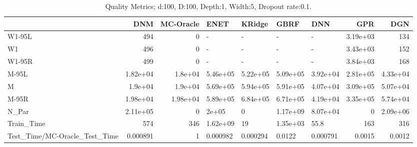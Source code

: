 \begin{table}
\centering
\caption{Quality Metrics; d:100, D:100, Depth:1, Width:5, Dropout rate:0.1.}
\begin{tabular}{lrrllllrr}
\toprule
{} &      DNM &  MC-Oracle &     ENET &   KRidge &     GBRF &      DNN &      GPR &      DGN \\
\midrule
W1-95L                        &      494 &          0 &        - &        - &        - &        - & 3.19e+03 &      134 \\
W1                            &      496 &          0 &        - &        - &        - &        - & 3.43e+03 &      152 \\
W1-95R                        &      499 &          0 &        - &        - &        - &        - & 3.84e+03 &      168 \\
M-95L                         & 1.82e+04 &    1.8e+04 & 5.46e+05 & 5.22e+05 & 5.09e+05 & 3.92e+04 & 2.81e+05 & 4.33e+04 \\
M                             &  1.9e+04 &    1.9e+04 & 5.69e+05 & 5.94e+05 & 5.91e+05 & 4.07e+04 & 3.09e+05 & 5.07e+04 \\
M-95R                         & 1.98e+04 &   1.98e+04 & 5.89e+05 & 6.84e+05 & 6.71e+05 & 4.19e+04 & 3.35e+05 & 5.74e+04 \\
N\_Par                         & 2.11e+05 &          0 &    2e+05 &        0 & 1.17e+09 & 8.07e+04 &        0 & 2.09e+06 \\
Train\_Time                    &      574 &        346 & 1.62e+09 &       19 & 1.35e+03 &     55.8 &      163 &      316 \\
Test\_Time/MC-Oracle\_Test\_Time & 0.000891 &          1 & 0.000982 & 0.000294 &   0.0122 & 0.000791 &   0.0015 &   0.0012 \\
\bottomrule
\end{tabular}
\end{table}
